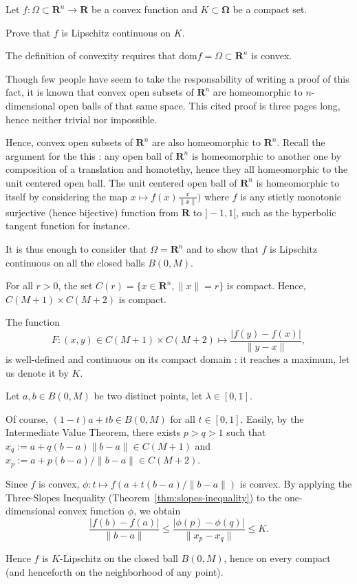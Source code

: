 \begin{exercise}
    Let $ f : \Omega \subset \mathbf R^n \to \mathbf R $ be a convex function and $ K \subset \mathbf \Omega $ be a compact set. 
    
    Prove that $ f $ is Lipschitz continuous on $ K $.
\end{exercise}

\begin{solution}
    The definition of convexity requires that $ \mathrm{dom} f = \Omega \subset \mathbf R^n $ is convex.

    Though few people have seem to take the responsability of writing a proof of this fact, it is known \cite{geschke2012} that convex open subsets of $ \mathbf R^n $ are homeomorphic to $ n $-dimensional open balls of that same space. This cited proof is three pages long, hence neither trivial nor impossible.

    Hence, convex open subsets of $ \mathbf R^n$ are also homeomorphic to $ \mathbf R^n $. Recall the argument for the this : any open ball of $ \mathbf R^n $ is homeomorphic to another one by composition of a translation and homotethy, hence they all homeomorphic to the unit centered open ball. The unit centered open ball of $ \mathbf R^n $ is homeomorphic to itself by considering the map $ x \mapsto f(x) \frac{x}{\|x\|}) $ where $ f $ is any stictly monotonic surjective (hence bijective) function from $ \mathbf R $ to $ ]-1,1[ $, such as the hyperbolic tangent function for instance.

    It is thus enough to consider that $ \Omega = \mathbf R^n $ and to show that $ f $ is Lipschitz continuous on all the closed balls $ B(0,M) $.

    For all $ r > 0 $, the set $ C(r) = \{ x \in \mathbf R^n, \|x\| = r \} $ is compact. Hence, $ C(M+1) \times C(M+2) $ is compact.

    The function
    \[
        F : (x,y) \in C(M+1) \times C(M+2) \mapsto \frac{|f(y)-f(x)|}{\|y-x\|},
    \]
    is well-defined and continuous on its compact domain : it reaches a maximum, let us denote it by $ K $.

    Let $ a,b \in B(0,M) $ be two distinct points, let $ \lambda \in [0,1] $. 
    
    Of course, $ (1-t) a + t b \in B(0,M) $ for all $ t \in [0,1] $. Easily, by the Intermediate Value Theorem, there exists $ p>q>1 $ such that $ x_q := a + q(b-a)\|b-a\| \in C(M+1) $ and $ x_p := a + p(b-a)/\|b-a\| \in C(M+2) $.
    
    Since $ f $ is convex, $ \phi : t \mapsto f(a+ t(b-a)/\|b-a\|) $ is convex. By applying the {Three-Slopes Inequality} (Theorem~\ref{thm:slopes-inequality}) to the one-dimensional convex function $ \phi $, we obtain
    \[
       \frac{|f(b)-f(a)|}{\|b-a\|} \leqslant \frac{|\phi(p) - \phi(q)|}{\|x_p-x_q\|} \leqslant K.
    \]

    Hence $ f $ is $ K $-Lipschitz on the closed ball $ B(0,M) $, hence on every compact (and henceforth on the neighborhood of any point).
\end{solution}

